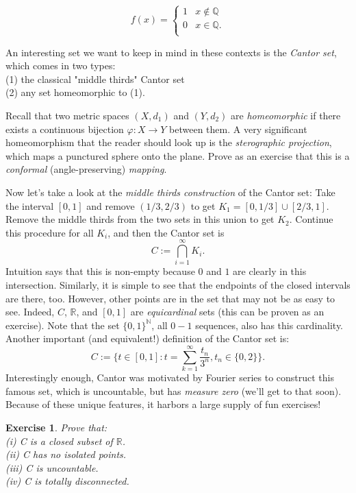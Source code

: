 \documentclass{article}
\newtheorem{exer}{Exercise}[section]
\begin{document}
\[ f(x) =   \left\{
\begin{array}{ll}
      1 &  x \notin \mathbb{Q} \\
      0 &  x \in \mathbb{Q} .  \\
\end{array} 
\right. \]

An interesting set we want to keep in mind in these contexts is the \textit{Cantor set}, which comes in two types: \\
(1) the classical "middle thirds" Cantor set \\
(2) any set homeomorphic to (1).

Recall that two metric spaces $(X, d_{1})$ and $(Y, d_{2})$ are \textit{homeomorphic} if there exists a continuous bijection $\varphi : X \to Y$ between them. A very significant homeomorphism that the reader should look up is the \textit{sterographic projection}, which maps a punctured sphere onto the plane. Prove as an exercise that this is a \textit{conformal} (angle-preserving) \textit{mapping}.

Now let's take a look at the \textit{middle thirds construction} of the Cantor set: Take the interval $[0,1]$ and remove $(1/3, 2/3)$ to get $K_{1} = [0, 1/3] \cup [2/3, 1]$. Remove the middle thirds from the two sets in this union to get $K_{2}$. Continue this procedure for all $K_{i}$, and then the Cantor set is
\begin{equation}
C := \bigcap_{i=1}^{\infty} K_{i}.
\end{equation}
Intuition says that this is non-empty because $0$ and $1$ are clearly in this intersection. Similarly, it is simple to see that the endpoints of the closed intervals are there, too. However, other points are in the set that may not be as easy to see. Indeed, $C$, $\mathbb{R}$, and $[0,1]$ are \textit{equicardinal} sets (this can be proven as an exercise). Note that the set $\{ {0,1} \}^{\mathbb{N}} $, all $0-1$ sequences, also has this cardinality. Another important (and equivalent!) definition of the Cantor set is:
$$C := \big\{ t \in [0,1] : t = \sum_{k=1}^{\infty} \frac{t_{n}}{3^{n}}, t_{n} \in \{0,2\} \big\}.$$
Interestingly enough, Cantor was motivated by Fourier series to construct this famous set, which is uncountable, but has \textit{measure zero} (we'll get to that soon). Because of these unique features, it harbors a large supply of fun exercises!

\begin{exer}
Prove that: \\
(i) C is a closed subset of $\mathbb{R}$. \\
(ii) C has no isolated points. \\
(iii) C is uncountable. \\
(iv) C is totally disconnected. 
\end{exer}
\end{document}
